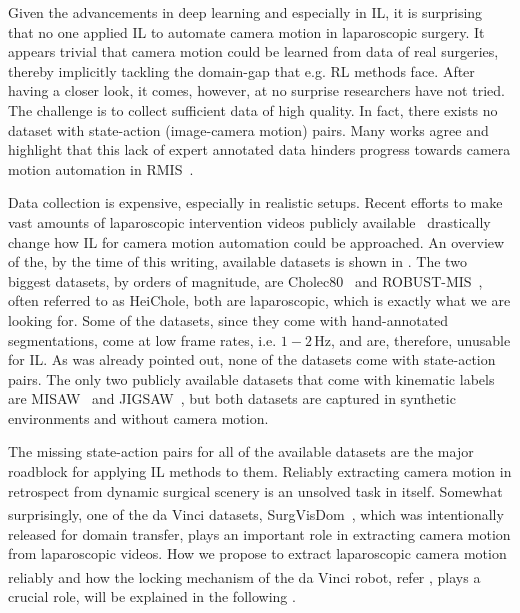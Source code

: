 Given the advancements in deep learning and especially in IL, it is surprising that no one applied IL to automate camera motion in laparoscopic surgery. It appears trivial that camera motion could be learned from data of real surgeries, thereby implicitly tackling the domain-gap that e.g. RL methods face. After having a closer look, it comes, however, at no surprise researchers have not tried. The challenge is to collect sufficient data of high quality. In fact, there exists no dataset with state-action (image-camera motion) pairs. Many works agree and highlight that this lack of expert annotated data hinders progress towards camera motion automation in RMIS~\cite{maier2022surgical,kassahun2016surgical,esteva2019guide}.

Data collection is expensive, especially in realistic setups. Recent efforts to make vast amounts of laparoscopic intervention videos publicly available~\cite{maier2022surgical} drastically change how IL for camera motion automation could be approached. An overview of the, by the time of this writing, available datasets is shown in . The two biggest datasets, by orders of magnitude, are Cholec80~\cite{twinanda2016endonet} and ROBUST-MIS~\cite{maier2020heidelberg}, often referred to as HeiChole, both are laparoscopic, which is exactly what we are looking for. Some of the datasets, since they come with hand-annotated segmentations, come at low frame rates, i.e. $1-2\,\text{Hz}$, and are, therefore, unusable for IL. As was already pointed out, none of the datasets come with state-action pairs. The only two publicly available datasets that come with kinematic labels are MISAW~\cite{mitsuishi2013master} and JIGSAW~\cite{ahmidi2017dataset}, but both datasets are captured in synthetic environments and without camera motion.

The missing state-action pairs for all of the available datasets are the major roadblock for applying IL methods to them. Reliably extracting camera motion in retrospect from dynamic surgical scenery is an unsolved task in itself. Somewhat surprisingly, one of the da Vinci\textsuperscript{\textregistered} datasets, SurgVisDom~\cite{zia2021surgical}, which was intentionally released for domain transfer, plays an important role in extracting camera motion from laparoscopic videos. How we propose to extract laparoscopic camera motion reliably and how the locking mechanism of the da Vinci\textsuperscript{\textregistered} robot, refer , plays a crucial role, will be explained in the following .


